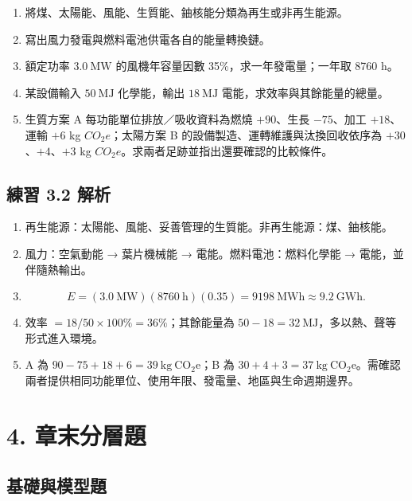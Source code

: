 \documentclass[11pt,a4paper]{article}
\providecommand{\tightlist}{%
  \setlength{\itemsep}{0pt}\setlength{\parskip}{0pt}}
\begin{document}
\begin{enumerate}
\def\labelenumi{\arabic{enumi}.}
\tightlist
\item
  將煤、太陽能、風能、生質能、鈾核能分類為再生或非再生能源。
\item
  寫出風力發電與燃料電池供電各自的能量轉換鏈。
\item
  額定功率 \(3.0\ \mathrm{MW}\) 的風機年容量因數 35\%，求一年發電量；一年取 8760 h。
\item
  某設備輸入 \(50\ \mathrm{MJ}\) 化學能，輸出 \(18\ \mathrm{MJ}\) 電能，求效率與其餘能量的總量。
\item
  生質方案 A 每功能單位排放／吸收資料為燃燒 \(+90\)、生長 \(-75\)、加工 \(+18\)、運輸 \(+6\) kg \(CO_2e\)；太陽方案 B 的設備製造、運轉維護與汰換回收依序為 \(+30\)、\(+4\)、\(+3\) kg \(CO_2e\)。求兩者足跡並指出還要確認的比較條件。
\end{enumerate}

\subsection{練習 3.2 解析}\label{ux7df4ux7fd2-3.2-ux89e3ux6790}

\begin{enumerate}
\def\labelenumi{\arabic{enumi}.}
\tightlist
\item
  再生能源：太陽能、風能、妥善管理的生質能。非再生能源：煤、鈾核能。
\item
  風力：空氣動能 → 葉片機械能 → 電能。燃料電池：燃料化學能 → 電能，並伴隨熱輸出。
\item
  \[E=(3.0\ \mathrm{MW})(8760\ \mathrm h)(0.35)=9198\ \mathrm{MWh}\approx9.2\ \mathrm{GWh}.\]
\item
  效率 \(=18/50\times100\%=36\%\)；其餘能量為 \(50-18=32\ \mathrm{MJ}\)，多以熱、聲等形式進入環境。
\item
  A 為 \(90-75+18+6=39\ \mathrm{kg\ CO_2e}\)；B 為 \(30+4+3=37\ \mathrm{kg\ CO_2e}\)。需確認兩者提供相同功能單位、使用年限、發電量、地區與生命週期邊界。
\end{enumerate}

\section{4. 章末分層題}\label{ux7ae0ux672bux5206ux5c64ux984c}

\subsection{基礎與模型題}\label{ux57faux790eux8207ux6a21ux578bux984c}
\end{document}
